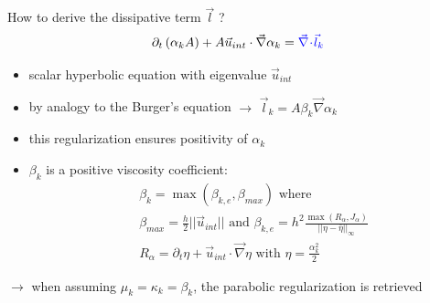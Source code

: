 \documentclass[xcolor=dvipsnames,10pt]{beamer}
\renewcommand{\div}{\vec{\nabla}\! \cdot \!}
\newcommand{\grad}{\vec{\nabla}}
\begin{document}
\begin{frame}{How to derive the dissipative term $\vec{l}$ ?}
\begin{equation}
\partial_t \left( \alpha_k  A\right) + A \vec{u}_{int} \cdot \grad \alpha_k = {\color{blue}\div \vec{l}_k} \nonumber
\end{equation}
\begin{block}{}
\begin{itemize}
\item scalar hyperbolic equation with eigenvalue $\vec{u}_{int}$
\item by analogy to the Burger's equation $\to$ $\vec{l}_k = A \beta_k \grad \alpha_k$
\item this regularization ensures positivity of $\alpha_k$
\item $\beta_k$ is a positive viscosity coefficient:
\begin{align}
&\beta_k = \max ( \beta_{k,e}, \beta_{max}) \text{ where }\nonumber \\
&\beta_{max} = \frac{h}{2} || \vec{u}_{int} || \text{ and } \beta_{k,e} = h^2 \frac{\max( R_\alpha, J_\alpha )}{|| \eta - \bar{\eta} ||_\infty} \nonumber \\
&R_\alpha = \partial_t \eta + \vec{u}_{int}\cdot \grad \eta \text{ with } \eta = \frac{\alpha_k^2}{2}  \nonumber
\end{align}
\end{itemize}
\end{block}
$\rightarrow$ when assuming $\mu_k = \kappa_k = \beta_k$, the parabolic regularization is retrieved
\end{frame}
\end{document}

